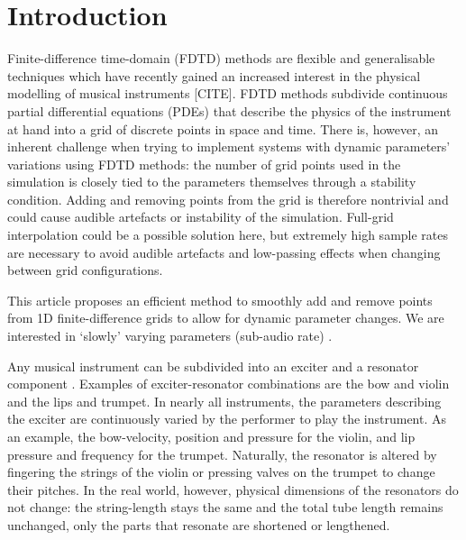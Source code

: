 \section{Introduction}

Finite-difference time-domain (FDTD) methods are flexible and generalisable techniques which have recently gained an increased interest in the physical modelling of musical instruments [CITE]. %
FDTD methods subdivide continuous partial differential equations (PDEs) that describe the physics of the instrument at hand into a grid of discrete points in space and time. 
There is, however, an inherent challenge when trying to implement systems with dynamic parameters' variations using FDTD methods: the number of grid points used in the simulation is closely tied to the parameters themselves through a stability condition.
Adding and removing points from the grid is therefore nontrivial and could cause audible artefacts or instability of the simulation. Full-grid interpolation \cite[Ch. 5]{bilbao2009} could be a possible solution here, but extremely high sample rates are necessary to avoid audible artefacts and low-passing effects when changing between grid configurations. 

This article proposes an efficient method to smoothly add and remove points from 1D finite-difference grids to allow for dynamic parameter changes. We are interested in `slowly' varying parameters (sub-audio rate) .

Any musical instrument can be subdivided into an exciter and a resonator component \cite{Borin1989}. Examples of exciter-resonator combinations are the bow and violin and the lips and trumpet. In nearly all instruments, the parameters describing the exciter are continuously varied by the performer to play the instrument. As an example, the bow-velocity, position and pressure for the violin, and lip pressure and frequency for the trumpet. Naturally, the resonator is altered by fingering the strings of the violin or pressing valves on the trumpet to change their pitches. In the real world, however, physical dimensions of the resonators do not change: the string-length stays the same and the total tube length remains unchanged, only the parts that resonate are shortened or lengthened.

